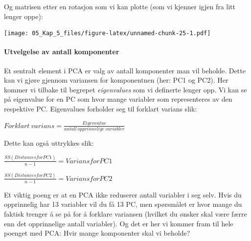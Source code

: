 \documentclass[
]{article}
\newenvironment{Shaded}{\begin{snugshade}}{\end{snugshade}}
\newcommand{\CommentTok}[1]{\textcolor[rgb]{0.56,0.35,0.01}{\textit{#1}}}
\newcommand{\FunctionTok}[1]{\textcolor[rgb]{0.00,0.00,0.00}{#1}}
\newcommand{\NormalTok}[1]{#1}
\newcommand{\OtherTok}[1]{\textcolor[rgb]{0.56,0.35,0.01}{#1}}
\newcommand{\SpecialCharTok}[1]{\textcolor[rgb]{0.00,0.00,0.00}{#1}}
\begin{document}
Og matrisen etter en rotasjon som vi kan plotte (som vi kjenner igjen fra litt lenger oppe):

\begin{Shaded}
\end{Shaded}

\texttt{[image: 05\_Kap\_5\_files/figure-latex/unnamed-chunk-25-1.pdf]}

\hypertarget{utvelgelse-av-antall-komponenter}{%
\paragraph{Utvelgelse av antall komponenter}\label{utvelgelse-av-antall-komponenter}}

Et sentralt element i PCA er valg av antall komponenter man vil beholde. Dette kan vi gjøre gjennom variansen for komponentnen (her: PC1 og PC2). Her kommer vi tilbake til begrepet \emph{eigenvalues} som vi definerte lenger opp. Vi kan se på eigenvalue for en PC som hvor mange variabler som representeres av den respektive PC. Eigenvalues forholder seg til forklart varians slik:

\(Forklart\ varians = \frac{Eigenvalue}{antall\ opprinnelige\ variabler}\)

Dette kan også uttrykkes slik:

\(\frac{SS(Distances for PC1)}{n - 1} = Varians for PC1\)

\(\frac{SS(Distances for PC2)}{n - 1} = Varians for PC2\)

Et viktig poeng er at en PCA ikke reduserer antall variabler i seg selv. Hvis du opprinnelig har 13 variabler vil du få 13 PC, men spørsmålet er hvor mange du faktisk trenger å se på for å forklare variansen (hvilket du ønsker skal være færre enn det opprinnelige antall variabler). Og det er her vi kommer fram til hele poenget med PCA: Hvir mange komponenter skal vi beholde?
\end{document}
